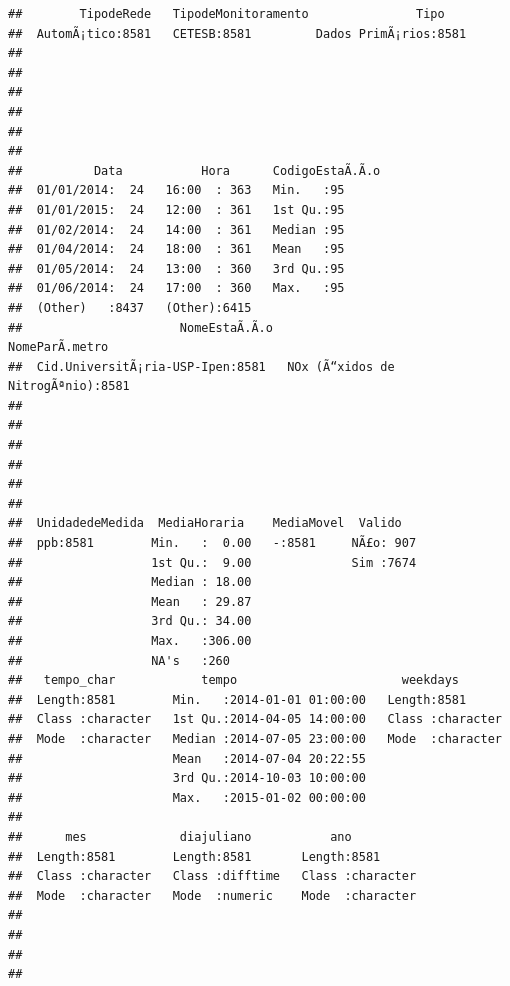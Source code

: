 \documentclass[]{book}
\theoremstyle{definition}
\theoremstyle{definition}
\theoremstyle{definition}
\theoremstyle{remark}
\begin{document}
\begin{verbatim}
##        TipodeRede   TipodeMonitoramento               Tipo     
##  AutomÃ¡tico:8581   CETESB:8581         Dados PrimÃ¡rios:8581  
##                                                                
##                                                                
##                                                                
##                                                                
##                                                                
##                                                                
##          Data           Hora      CodigoEstaÃ.Ã.o
##  01/01/2014:  24   16:00  : 363   Min.   :95     
##  01/01/2015:  24   12:00  : 361   1st Qu.:95     
##  01/02/2014:  24   14:00  : 361   Median :95     
##  01/04/2014:  24   18:00  : 361   Mean   :95     
##  01/05/2014:  24   13:00  : 360   3rd Qu.:95     
##  01/06/2014:  24   17:00  : 360   Max.   :95     
##  (Other)   :8437   (Other):6415                  
##                      NomeEstaÃ.Ã.o                       NomeParÃ.metro
##  Cid.UniversitÃ¡ria-USP-Ipen:8581   NOx (Ã“xidos de NitrogÃªnio):8581  
##                                                                        
##                                                                        
##                                                                        
##                                                                        
##                                                                        
##                                                                        
##  UnidadedeMedida  MediaHoraria    MediaMovel  Valido    
##  ppb:8581        Min.   :  0.00   -:8581     NÃ£o: 907  
##                  1st Qu.:  9.00              Sim :7674  
##                  Median : 18.00                         
##                  Mean   : 29.87                         
##                  3rd Qu.: 34.00                         
##                  Max.   :306.00                         
##                  NA's   :260                            
##   tempo_char            tempo                       weekdays        
##  Length:8581        Min.   :2014-01-01 01:00:00   Length:8581       
##  Class :character   1st Qu.:2014-04-05 14:00:00   Class :character  
##  Mode  :character   Median :2014-07-05 23:00:00   Mode  :character  
##                     Mean   :2014-07-04 20:22:55                     
##                     3rd Qu.:2014-10-03 10:00:00                     
##                     Max.   :2015-01-02 00:00:00                     
##                                                                     
##      mes             diajuliano           ano           
##  Length:8581        Length:8581       Length:8581       
##  Class :character   Class :difftime   Class :character  
##  Mode  :character   Mode  :numeric    Mode  :character  
##                                                         
##                                                         
##                                                         
## 
\end{verbatim}
\end{document}
